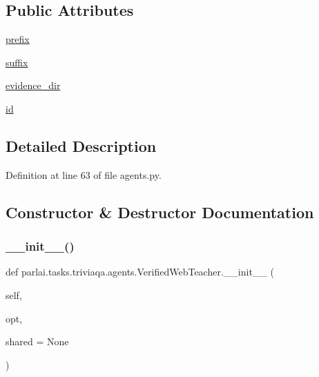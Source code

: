 \subsection*{Public Attributes}
\begin{DoxyCompactItemize}
\item 
\hyperlink{classparlai_1_1tasks_1_1triviaqa_1_1agents_1_1VerifiedWebTeacher_a87ba370cc7703d6d0674576f12bd374d}{prefix}
\item 
\hyperlink{classparlai_1_1tasks_1_1triviaqa_1_1agents_1_1VerifiedWebTeacher_a664ec91ac0757abaaf6853ea939232e4}{suffix}
\item 
\hyperlink{classparlai_1_1tasks_1_1triviaqa_1_1agents_1_1VerifiedWebTeacher_a6c7349009918dcbbfc17f930458e8698}{evidence\+\_\+dir}
\item 
\hyperlink{classparlai_1_1tasks_1_1triviaqa_1_1agents_1_1VerifiedWebTeacher_a482a09c00640e0bc928c2f8f9b1e20a1}{id}
\end{DoxyCompactItemize}


\subsection{Detailed Description}


Definition at line 63 of file agents.\+py.



\subsection{Constructor \& Destructor Documentation}
\mbox{\label{classparlai_1_1tasks_1_1triviaqa_1_1agents_1_1VerifiedWebTeacher_a24150c529859f238cecd45835b93111a}} 
\subsubsection{\texorpdfstring{\+\_\+\+\_\+init\+\_\+\+\_\+()}{\_\_init\_\_()}}
{\footnotesize\ttfamily def parlai.\+tasks.\+triviaqa.\+agents.\+Verified\+Web\+Teacher.\+\_\+\+\_\+init\+\_\+\+\_\+ (\begin{DoxyParamCaption}\item[{}]{self,  }\item[{}]{opt,  }\item[{}]{shared = {\ttfamily None} }\end{DoxyParamCaption})}



